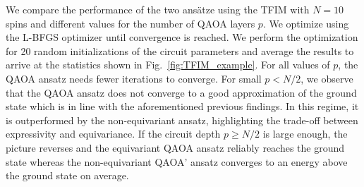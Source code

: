 \documentclass[a4paper,twocolumn,notitlepage,nofootinbib,superscriptaddress,floatfix]{revtex4-2}
\begin{document}
We compare the performance of the two ansätze using the TFIM with $N=10$ spins and different values for the number of QAOA layers $p$. We optimize using the L-BFGS optimizer until convergence is reached. We perform the optimization for 20 random initializations of the circuit parameters and average the results to arrive at the statistics shown in Fig.~\ref{fig:TFIM_example}. 
For all values of $p$, the QAOA ansatz needs fewer iterations to converge. For small $p < N/2$, we observe that the QAOA ansatz does not converge to a good approximation of the ground state which is in line with the aforementioned previous findings. In this regime, it is outperformed by the non-equivariant ansatz, highlighting the trade-off between expressivity and equivariance. If the circuit depth $p\ge {N}/{2}$ is large enough, the picture reverses and the equivariant QAOA ansatz reliably reaches the ground state whereas the non-equivariant QAOA' ansatz converges to an energy above the ground state on average. 
\end{document}
